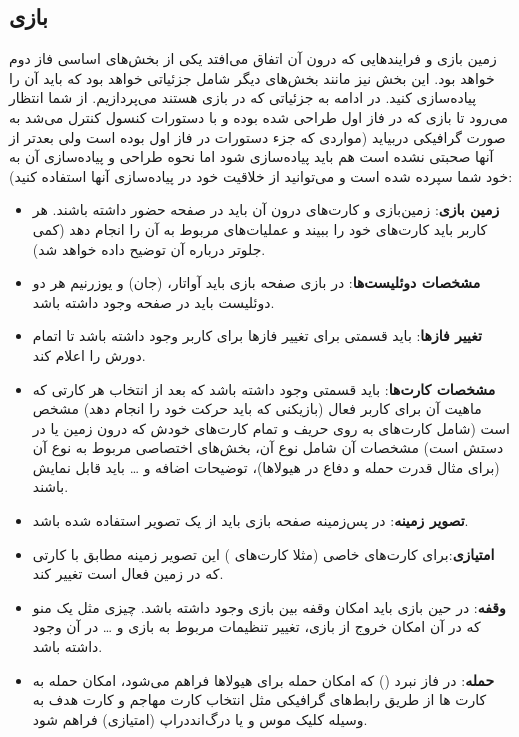 \documentclass[]{article}
\begin{document}
\subsection*{{\titr بازی}}
زمین بازی و فرایندهایی که درون آن اتفاق ‌می‌افتد یکی از بخش‌های اساسی فاز دوم خواهد بود. این بخش نیز مانند بخش‌های دیگر شامل جزئیاتی خواهد بود که باید آن را پیاده‌سازی کنید.  در ادامه به جزئیاتی که در بازی هستند می‌پردازیم. از شما انتظار می‌رود تا بازی که در فاز اول طراحی شده بوده و با دستورات کنسول کنترل می‌شد به صورت گرافیکی دربیاید (مواردی که جزء دستورات در فاز اول بوده است ولی بعدتر از آنها صحبتی نشده است هم باید پیاده‌سازی شود اما نحوه طراحی و پیاده‌سازی آن به خود شما سپرده شده است و می‌توانید از خلاقیت خود در پیاده‌سازی آنها استفاده کنید)‌:

\begin{itemize}
    \item \textbf{زمین بازی}: زمین‌بازی و کارت‌های درون آن باید در صفحه حضور داشته باشند. هر کاربر باید کارت‌های خود را ببیند و عملیات‌های مربوط به آن را انجام دهد (کمی جلوتر درباره آن توضیح داده خواهد شد).
    \item \textbf{مشخصات دوئلیست‌ها}: در بازی صفحه بازی باید آواتار،  (جان) و یوزرنیم هر دو دوئلیست باید در صفحه وجود داشته باشد.
    \item \textbf{تغییر فازها}: باید قسمتی برای تغییر فازها برای کاربر وجود داشته باشد تا اتمام دورش را اعلام کند.
    \item \textbf{مشخصات کارت‌ها}: باید قسمتی وجود داشته باشد که بعد از انتخاب هر کارتی که ماهیت آن برای کاربر فعال (بازیکنی که باید حرکت خود را انجام دهد) مشخص است (شامل کارت‌های به روی حریف و تمام کارت‌های خودش که درون زمین یا در دستش است) مشخصات آن شامل نوع آن، بخش‌های اختصاصی مربوط به نوع آن (برای مثال قدرت حمله و دفاع در هیولاها)، توضیحات اضافه و … باید قابل نمایش باشند.
    \item \textbf{تصویر زمینه}: در پس‌زمینه صفحه بازی باید از یک تصویر استفاده شده باشد.
    \item \textbf{امتیازی}:برای کارت‌های خاصی (مثلا کارت‌های ) این تصویر زمینه مطابق با کارتی که در زمین فعال است تغییر کند.
    \item \textbf{وقفه}: در حین بازی باید امکان وقفه بین بازی وجود داشته باشد. چیزی مثل یک منو  که در آن امکان خروج از بازی، تغییر تنظیمات مربوط به بازی و … در آن وجود داشته باشد.
    \item \textbf{حمله}: در فاز نبرد () که امکان حمله برای هیولاها فراهم می‌شود، امکان حمله به کارت ها از طریق رابط‌های گرافیکی مثل انتخاب کارت مهاجم و کارت هدف به وسیله کلیک موس و یا درگ‌اند‌دراپ (امتیازی) فراهم شود.

\end{itemize}
\end{document}
